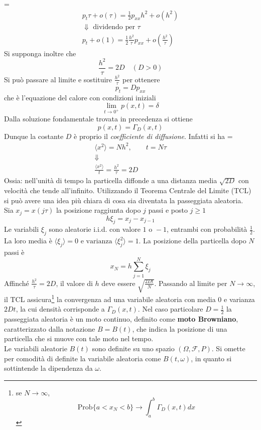\documentclass[a4paper,12pt, draft]{article}
\theoremstyle{break}
\numberwithin{equation}{section}
\begin{document}
{\everymath={\displaystyle}
\[
  \begin{array}{c}
   p_t\tau + o(\tau) = \frac{1}{2}p_{xx}h^2 +o(h^2) \\
   \Downarrow \mbox{ dividendo per }\tau \\
   p_t + o(1) = \frac{1}{2}\frac{h^2}{\tau} p_{xx}+o\left(\frac{h^2}{\tau}\right) 
  \end{array}
\]
}
Si supponga inoltre che 
\[
  \frac{h^2}{\tau} = 2D \quad (D > 0)
\]
Si può passare al limite e sostituire \(\frac{h^2}{\tau}\) per ottenere
\[
  p_t = Dp_{xx}
\]
che è l'equazione del calore con condizioni iniziali
\[
  \lim_{t \to 0^+} p(x, t) = \delta
\]
Dalla soluzione fondamentale trovata in precedenza si ottiene
\[
  p(x,t) = \Gamma_D(x,t)
\]
Dunque la costante \(D\) è proprio il \emph{coefficiente di diffusione}. Infatti si ha
{\everymath = {\displaystyle}
\[
\begin{array}{c}
  \langle x^2 \rangle = Nh^2, \qquad t= N\tau \\
   \Downarrow  \\
   \frac{\langle x^2 \rangle}{t} = \frac{h^2}{\tau} = 2D 
  \end{array}  
\]}
Ossia: nell'unità di tempo la particella diffonde a una distanza media \(\sqrt{2D}\) con velocità che tende all'infinito.
Utilizzando il Teorema Centrale del Limite (TCL) si può avere una idea più chiara di cosa sia diventata la passeggiata aleatoria. \\
Sia  \(x_j = x(j\tau)\) la posizione raggiunta dopo \(j\) passi e posto \(j \geq 1\) 
\[
  h\xi_j = x_j - x_{j -1} 
\]
Le variabili \(\xi_j\) sono aleatorie i.i.d. con valore \(1 \mbox{ o } -1\), entrambi con probabilità \(\frac{1}{2}\). La loro media è \(\langle \xi_j \rangle = 0 \mbox{ e varianza }\langle \xi^2_j \rangle = 1\). La posizione della particella dopo \(N\) passi è 
\[
  x_N = h\sum_{j = 1}^N \xi_j
\]
Affinché \(\frac{h^2}{\tau} = 2D\), il valore di \(h\) deve essere \(\sqrt{\frac{2Dt}{N}}\). Passando al limite per \(N \to \infty\), il TCL assicura\footnote{se \(N \to \infty\), \[\mbox{Prob}\{a < x_N < b\} \to \int_a^b \Gamma_D(x,t)dx\]} la convergenza ad una variabile aleatoria con media \(0\) e varianza \(2Dt\), la cui densità corrisponde a \(\Gamma_D(x,t)\).
Nel caso particolare \(D=\frac{1}{2}\) la passeggiata aleatoria è un moto continuo, definito come \textbf{moto Browniano}, caratterizzato dalla notazione \(B = B(t)\), che indica la posizione di una particella che si muove con tale moto nel tempo. \\
Le variabili aleatorie \(B(t)\) sono definite su uno spazio \((\Omega, \mathcal{F}, P)\). Si omette per comodità di definite la variabile aleatoria come \(B(t, \omega)\), in quanto si sottintende la dipendenza da \(\omega\). \\
\end{document}
